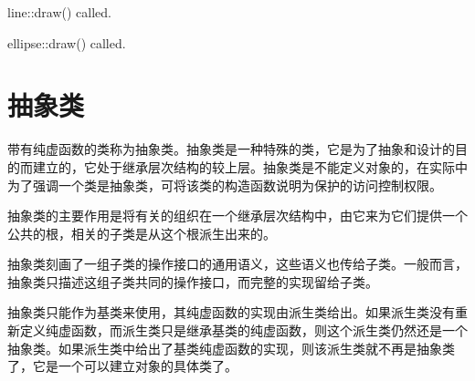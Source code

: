 \documentclass[UTF8,a4paper,8pt]{ctexart}
\begin{document}
   line::draw() called.
   
   ellipse::draw() called.
   
\section{抽象类}
   
   带有纯虚函数的类称为抽象类。抽象类是一种特殊的类，它是为了抽象和设计的目的而建立的，它处于继承层次结构的较上层。抽象类是不能定义对象的，在实际中为了强调一个类是抽象类，可将该类的构造函数说明为保护的访问控制权限。
   
   抽象类的主要作用是将有关的组织在一个继承层次结构中，由它来为它们提供一个公共的根，相关的子类是从这个根派生出来的。
   
   抽象类刻画了一组子类的操作接口的通用语义，这些语义也传给子类。一般而言，抽象类只描述这组子类共同的操作接口，而完整的实现留给子类。
   
   抽象类只能作为基类来使用，其纯虚函数的实现由派生类给出。如果派生类没有重新定义纯虚函数，而派生类只是继承基类的纯虚函数，则这个派生类仍然还是一个 抽象类。如果派生类中给出了基类纯虚函数的实现，则该派生类就不再是抽象类了，它是一个可以建立对象的具体类了。 
 
 		     
\end{document}
